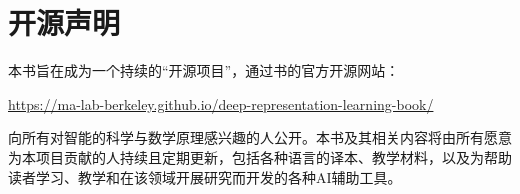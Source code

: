 \documentclass[../../book-main_zh.tex]{subfiles}
\begin{document}
\chapter*{开源声明}


本书旨在成为一个持续的“开源项目”，通过书的官方开源网站：
\begin{center}
    \url{https://ma-lab-berkeley.github.io/deep-representation-learning-book/}
\end{center}
向所有对智能的科学与数学原理感兴趣的人公开。本书及其相关内容将由所有愿意为本项目贡献的人持续且定期更新，包括各种语言的译本、教学材料，以及为帮助读者学习、教学和在该领域开展研究而开发的各种AI辅助工具。
\end{document}
